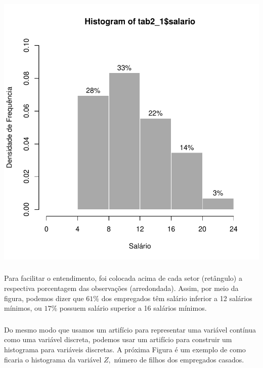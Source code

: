 \documentclass[14pt,aspectratio=1610]{beamer}
\begin{document}
\begin{frame}{}
\frametitle{}
\begin{block}{}
\begin{center}
\includegraphics{Aula1-hist}
\end{center}
\end{block}
\end{frame}

\begin{frame}{}
\frametitle{}
\begin{block}{}
\justifying
Para facilitar o entendimento, foi colocada acima de cada setor (retângulo) a respectiva
porcentagem das observações (arredondada). Assim, por meio da figura, podemos
dizer que $61\%$ dos empregados têm salário inferior a 12 salários mínimos, ou
$17\%$ possuem salário superior a 16 salários mínimos.
\end{block}
\end{frame}

\begin{frame}{}
\frametitle{}
\begin{block}{}
\justifying
Do mesmo modo que usamos um artifício para representar uma variável contínua
como uma variável discreta, podemos usar um artifício para construir um histograma
para variáveis discretas. A próxima Figura é um exemplo de como ficaria o histograma da
variável $Z,$ número de filhos dos empregados casados.
\end{block}
\end{frame}
\end{document}
